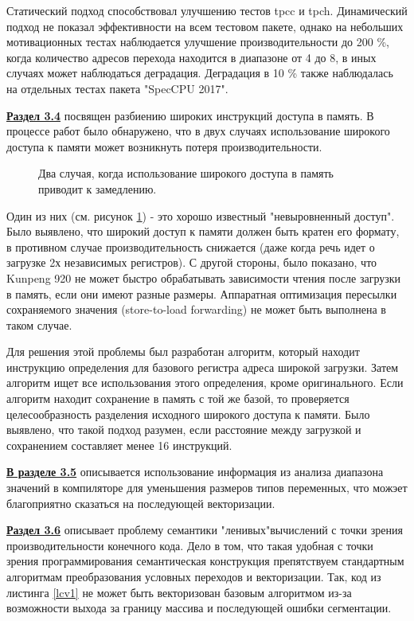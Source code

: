  Статический подход способствовал улучшению тестов tpcc и tpch. Динамический подход не показал эффективности на всем тестовом пакете, однако на небольших мотивационных тестах  наблюдается улучшение производительности до 200 \%, когда количество адресов перехода
 находится в диапазоне от 4 до 8, в иных случаях может наблюдаться деградация.
 Деградация в 10 \% также наблюдалась на отдельных тестах пакета
 "SpecCPU 2017".
 
\underline{\textbf{Раздел 3.4}} посвящен разбиению широких инструкций доступа в память. В процессе работ было обнаружено, что в двух случаях использование широкого доступа к памяти может
возникнуть потеря производительности. 
\begin{figure}[htbp]
	\centering
	
	\caption{Два случая, когда использование широкого доступа в память приводит к замедлению.}
	\label{splitsvg1}
\end{figure}


Один из них (см. рисунок \ref{splitsvg1}) - это хорошо известный "невыровненный доступ". Было выявлено, что широкий доступ к памяти должен быть кратен его формату, в противном случае производительность снижается (даже когда речь идет о загрузке 2х независимых регистров). С другой стороны, было показано, что Kunpeng 920 не может быстро обрабатывать зависимости чтения после загрузки в память, если они имеют разные размеры. Аппаратная оптимизация пересылки сохраняемого значения (store-to-load forwarding) не может быть выполнена в таком случае.

Для решения этой проблемы был разработан алгоритм,
который находит инструкцию определения для базового регистра адреса широкой
загрузки. Затем алгоритм ищет все использования этого определения,
кроме оригинального. Если алгоритм находит сохранение в память с той же
базой, то проверяется целесообразность разделения исходного широкого доступа
к памяти. Было выявлено, что такой подход разумен, если расстояние
между загрузкой и сохранением составляет менее 16 инструкций.
 
 
 
 \underline{\textbf{В разделе 3.5}} описывается использование информация из анализа диапазона значений в компиляторе для уменьшения размеров типов переменных, что можэет благоприятно сказаться на последующей векторизации. 
 
  \underline{\textbf{Раздел 3.6}} описывает проблему семантики "ленивых"\phantom{ }вычислений с точки зрения производительности конечного кода. Дело в том, что такая удобная с точки зрения программирования семантическая конструкция препятствуем стандартным алгоритмам  преобразования условных переходов и векторизации. Так, код из листинга \ref{lcv1} не может быть векторизован базовым алгоритмом из-за возможности выхода за границу массива и последующей ошибки сегментации.
  
